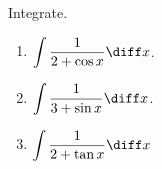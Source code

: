 Integrate.
\begin{enumerate}
\item $\displaystyle \int \frac{1}{2+\cos x}\diff x$.
\item $\displaystyle \int \frac{1}{3+\sin x}\diff x$.
\item $\displaystyle \int \frac{1}{2+\tan x}\diff x$
\end{enumerate}